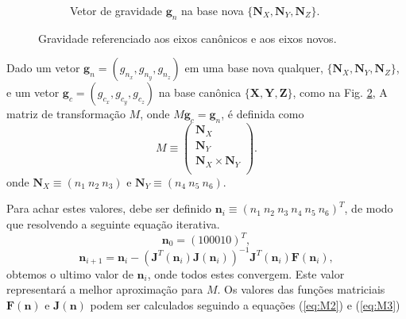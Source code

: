\documentclass[a4paper,10pt]{report}
\begin{document}
\begin{figure}[h!]
\begin{subfigure}[b]{0.35\textwidth}
  \caption{Vetor de gravidade $\mathbf{g}_n$ na base nova $\{\mathbf{N}_X,\mathbf{N}_Y,\mathbf{N}_Z\}$.}
  \label{fig:ejes1}
  \end{subfigure}
\caption{ Gravidade referenciado aos eixos canônicos e aos eixos novos.}
\label{fig:ejes}
\end{figure}

\begin{theo}


Dado um vetor $\mathbf{g}_n=(g_{n_x},g_{n_y},g_{n_z})$ em uma base nova qualquer, 
$\{\mathbf{N}_X,\mathbf{N}_Y,\mathbf{N}_Z\}$, e um vetor $\mathbf{g}_c=(g_{c_x},g_{c_y},g_{c_z})$
na base canônica $\{\mathbf{X},\mathbf{Y},\mathbf{Z}\}$, como na Fig. \ref{fig:ejes}, 
A matriz de transformação $M$, onde $M \mathbf{g}_c = \mathbf{g}_n$, é definida
como
\begin{equation}\label{eq:theoM2}
M \equiv \left ( \begin{matrix}
\mathbf{N}_X \\
\mathbf{N}_Y \\
\mathbf{N}_X \times \mathbf{N}_Y \\
\end{matrix}\right).
\end{equation}
onde $\mathbf{N}_X \equiv (n_1 ~ n_2 ~ n_3)$ e $\mathbf{N}_Y \equiv (n_4 ~ n_5 ~ n_6)$.

Para achar estes valores, debe ser definido 
$\mathbf{n}_{i} \equiv (n_1 ~ n_2 ~ n_3 ~ n_4 ~ n_5 ~ n_6)^T$,
de modo que resolvendo a seguinte equação iterativa.
\begin{equation} \label{eq:theoM0}
\mathbf{n}_{0}=(1 0 0 0 1 0)^T,
\end{equation}
\begin{equation} \label{eq:theoM1}
 \mathbf{n}_{i+1}=\mathbf{n}_{i}- \left( \mathbf{J}^T(\mathbf{n}_{i}) \mathbf{J}(\mathbf{n}_{i})\right)^{-1} \mathbf{J}^T(\mathbf{n}_{i}) \mathbf{F}(\mathbf{n}_{i}),
\end{equation}
obtemos o ultimo valor de $\mathbf{n}_{i}$, onde todos estes convergem.
Este valor representará a melhor aproximação para $M$. Os valores das funções matriciais
$\mathbf{F}(\mathbf{n})$ e $\mathbf{J}(\mathbf{n})$ podem ser calculados seguindo a equações (\ref{eq:M2})
e (\ref{eq:M3})

\end{theo}
\end{document}
